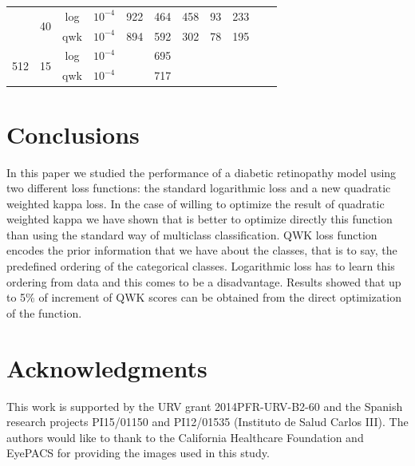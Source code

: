 \documentclass{IOS-Book-Article}
\begin{document}
\begin{table}[h!]
\begin{tabular}{c|c|c|c|c|c|c|c|c|c|c}
		\cline{2-10}
		& \multirow{2}{*}{40} & \multirow{1}{*}{log} & $10^{-4}$ & 922 & 464 & 458 & 93 & 233 & \\\cline{3-10}
		& & \multirow{1}{*}{qwk} & $10^{-4}$ & 894 & 592 & 302 & 78 & 195 & \\
		\cline{2-10}
		\hline					
		\multirow{2}{*}{512} & \multirow{2}{*}{15} & \multirow{1}{*}{log} & $10^{-4}$ &  & 695 &  &  & & \\\cline{3-10}
	    &  & \multirow{1}{*}{qwk} & $10^{-4}$ &  & 717 &  &  & &  \\	
		\cline{2-10}	
		\hline
	\end{tabular}
\end{table}


\section{Conclusions}
In this paper we studied the performance of a diabetic retinopathy model using two different loss functions: the standard logarithmic loss and a new quadratic weighted kappa loss. In the case of willing to optimize the result of quadratic weighted kappa we have shown that is better to optimize directly this function than using the standard way of multiclass classification. QWK loss function encodes the prior information that we have about the classes, that is to say, the predefined ordering of the categorical classes. Logarithmic loss has to learn this ordering from data and this comes to be a disadvantage. Results showed that up to 5\% of increment of QWK scores can be obtained from the direct optimization of the function.


\section*{Acknowledgments}
{\tiny This work is supported by the URV grant 2014PFR-URV-B2-60 and the Spanish research projects PI15/01150 and PI12/01535 (Instituto de Salud Carlos III). The authors would like to thank to the California Healthcare Foundation and EyePACS for providing the images used in this study.}




\end{document}
